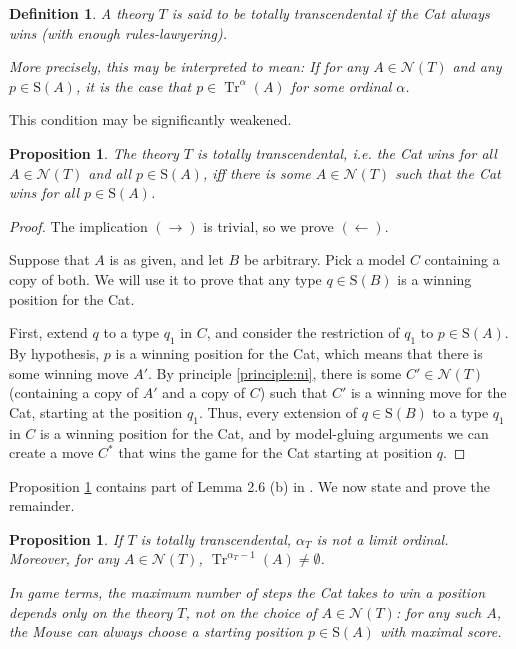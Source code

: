 \documentclass{article}
\newtheorem{prop}[theorem]{Proposition}
\newtheorem{definition}[theorem]{Definition}
\theoremstyle{nonumberplain}
\newtheorem{proof}{Proof}
\newcommand{\calN}{\mathcal{N}}
\newcommand{\Stone}{\mathrm{S}}
\DeclareMathOperator{\Tr}{Tr}
\begin{document}
\begin{definition}
A theory $T$ is said to be \emph{totally transcendental} if the Cat always wins (with enough rules-lawyering).

More precisely, this may be interpreted to mean: If for any $A \in \calN(T)$ and any $p \in \Stone(A)$, it is the case that $p \in \Tr^\alpha(A)$ for some ordinal $\alpha$.
\end{definition}

This condition may be significantly weakened.

\begin{prop}\label{prop:weaktt}
The theory $T$ is totally transcendental, i.e. the Cat wins for all $A \in \calN(T)$ and all $p \in \Stone(A)$, iff there is some $A \in \calN(T)$ such that the Cat wins for all $p \in \Stone(A)$.
\end{prop}

\begin{proof}
The implication $(\rightarrow)$ is trivial, so we prove $(\leftarrow)$.

Suppose that $A$ is as given, and let $B$ be arbitrary. Pick a model $C$ containing a copy of both. We will use it to prove that any type $q \in \Stone(B)$ is a winning position for the Cat.

First, extend $q$ to a type $q_1$ in $C$, and consider the restriction of $q_1$ to $p \in \Stone(A)$. By hypothesis, $p$ is a winning position for the Cat, which means that there is some winning move $A'$. By principle \ref{principle:ni}, there is some $C' \in \calN(T)$ (containing a copy of $A'$ and a copy of $C$) such that $C'$ is a winning move for the Cat, starting at the position $q_1$. Thus, every extension of $q \in \Stone(B)$ to a type $q_1$ in $C$ is a winning position for the Cat, and by model-gluing arguments we can create a move $C^*$ that wins the game for the Cat starting at position $q$.
\end{proof}

Proposition \ref{prop:weaktt} contains part of Lemma 2.6 (b) in \cite{morley}. We now state and prove the remainder.

\begin{prop}
If $T$ is totally transcendental, $\alpha_T$ is not a limit ordinal. Moreover, for any $A \in \calN(T)$, $\Tr^{\alpha_T - 1}(A) \neq \emptyset$.

In game terms, the maximum number of steps the Cat takes to win a position depends only on the theory $T$, not on the choice of $A \in \calN(T)$: for any such $A$, the Mouse can always choose a starting position $p \in \Stone(A)$ with maximal score.
\end{prop}
\end{document}
